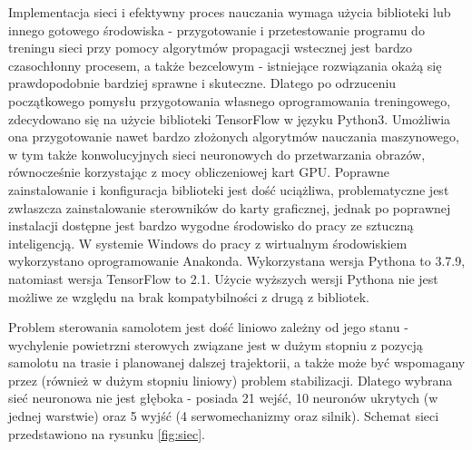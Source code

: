 \documentclass[12pt, a4paper]{article}
\begin{document}
Implementacja sieci i efektywny proces nauczania wymaga użycia biblioteki lub innego gotowego środowiska - przygotowanie i przetestowanie programu do treningu sieci przy pomocy algorytmów propagacji wstecznej jest bardzo czasochłonny procesem, a także bezcelowym - istniejące rozwiązania okażą się prawdopodobnie bardziej sprawne i skuteczne. Dlatego po odrzuceniu początkowego pomysłu przygotowania własnego oprogramowania treningowego, zdecydowano się na użycie biblioteki TensorFlow w języku Python3. Umożliwia ona przygotowanie nawet bardzo złożonych algorytmów nauczania maszynowego, w tym także konwolucyjnych sieci neuronowych do przetwarzania obrazów, równocześnie korzystając z mocy obliczeniowej kart GPU. Poprawne zainstalowanie i konfiguracja biblioteki jest dość uciążliwa, problematyczne jest zwłaszcza zainstalowanie sterowników do karty graficznej, jednak po poprawnej instalacji dostępne jest bardzo wygodne środowisko do pracy ze sztuczną inteligencją. W systemie Windows do pracy z wirtualnym środowiskiem wykorzystano oprogramowanie Anakonda. Wykorzystana wersja Pythona to 3.7.9, natomiast wersja TensorFlow to 2.1. Użycie wyższych wersji Pythona nie jest możliwe ze względu na brak kompatybilności z drugą z bibliotek.

Problem sterowania samolotem jest dość liniowo zależny od jego stanu - wychylenie powietrzni sterowych związane jest w dużym stopniu z pozycją samolotu na trasie i planowanej dalszej trajektorii, a także może być wspomagany przez (również w dużym stopniu liniowy) problem stabilizacji. Dlatego wybrana sieć neuronowa nie jest głęboka - posiada 21 wejść, 10 neuronów ukrytych (w jednej warstwie) oraz 5 wyjść (4 serwomechanizmy oraz silnik). Schemat sieci przedstawiono na rysunku \ref{fig:siec}.
\end{document}
